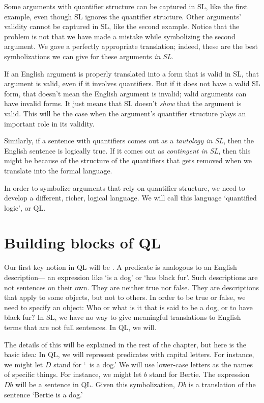 Some arguments with quantifier structure can be captured in SL, like the first example, even though SL ignores the quantifier structure. Other arguments' validity cannot be captured in SL, like the second example. Notice that the problem is not that we have made a mistake while symbolizing the second argument. We gave a perfectly appropriate translation; indeed, these are the best symbolizations we can give for these arguments \emph{in SL}.

If an English argument is properly translated into a form that is valid in SL, that argument is valid, even if it involves quantifiers. But if it does not have a valid SL form, that doesn't mean the English argument is invalid; valid arguments can have invalid forms. It just means that SL doesn't \emph{show} that the argument is valid. This will be the case when the argument's quantifier structure plays an important role in its validity.

Similarly, if a sentence with quantifiers comes out as a \emph{tautology in SL}, then the English sentence is logically true. If it comes out as \emph{contingent in SL}, then this might be because of the structure of the quantifiers that gets removed when we translate into the formal language.

In order to symbolize arguments that rely on quantifier structure, we need to develop a different, richer, logical language. We will call this language `quantified logic', or QL.

\section{Building blocks of QL}

Our first key notion in QL will be . A predicate is analogous to an English description--- an expression like `is a dog' or `has black fur'. Such descriptions are not sentences on their own. They are neither true nor false. They are descriptions that apply to some objects, but not to others. In order to be true or false, we need to specify an object: Who or what is it that is said to be a dog, or to have black fur? In SL, we have no way to give meaningful translations to English terms that are not full sentences. In QL, we will.

The details of this will be explained in the rest of the chapter, but here is the basic idea: In QL, we will represent predicates with capital letters. For instance, we might let $D$ stand for `\blank\ is a dog.' We will use lower-case letters as the names of specific things. For instance, we might let $b$ stand for Bertie. The expression $Db$ will be a sentence in QL. Given this symbolization, $Db$ is a translation of the sentence `Bertie is a dog.'

